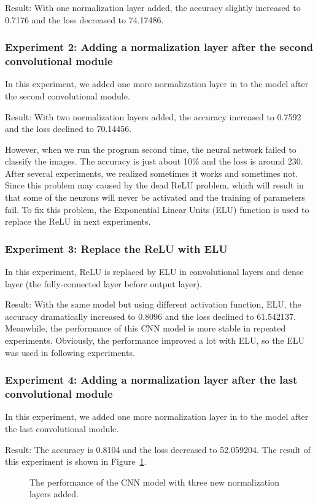 \documentclass[]{UCD_CS_FYP_Report}
\begin{document}
Result: With one normalization layer added, the accuracy slightly increased to 0.7176 and the loss decreased to 74.17486.
%
\subsubsection{Experiment 2: Adding a normalization layer after the second convolutional module}
In this experiment, we added one more normalization layer in to the model after the second convolutional module.

Result: With two normalization layers added, the accuracy increased to 0.7592 and the loss declined to 70.14456.

However, when we run the program second time, the neural network failed to classify the images. The accuracy is just about 10\% and the loss is around 230. After several experiments, we realized sometimes it works and sometimes not. Since this problem may caused by the dead ReLU problem, which will result in that some of the neurons will never be activated and the training of parameters fail. To fix this problem, the Exponential Linear Units (ELU) function is used to replace the ReLU in next experiments.
%
\subsubsection{Experiment 3: Replace the ReLU with ELU}
In this experiment, ReLU is replaced by ELU in convolutional layers and dense layer (the fully-connected layer before output layer).

Result: With the same model but using different activation function, ELU, the accuracy dramatically increased to 0.8096 and the loss declined to 61.542137. Meanwhile, the performance of this CNN model is more stable in repeated experiments. Obviously, the performance improved a lot with ELU, so the ELU was used in following experiments.
%
\subsubsection{Experiment 4: Adding a normalization layer after the last convolutional module}
In this experiment, we added one more normalization layer in to the model after the last convolutional module. 

Result: The accuracy is 0.8104 and the loss decreased to 52.059204. The result of this experiment is shown in Figure~\ref{fig:CIFAR_10_CNN_S5E4}.
\begin{figure}[h]
\centering
\fboxsep 2mm
\caption{\label{fig:CIFAR_10_CNN_S5E4} The performance of the CNN model with three new normalization layers added.}
\end{figure}
\end{document}
